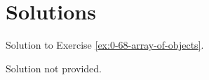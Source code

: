 

\newpage\section*{Solutions}
Solution to Exercise \ref{ex:0-68-array-of-objects}.


    Solution not provided.
    

\setlength{\oldparskip}{\parskip}
\setlength{\parskip}{1.0\oldparskip}

{\tiny{\,}}

\setlength{\parskip}{\oldparskip}
        
